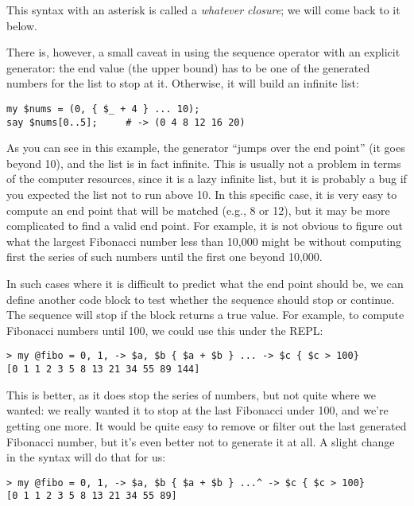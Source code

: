 This syntax with an asterisk is called a 
\emph{whatever closure}; we will come back to 
it below.

There is, however, a small caveat in using the sequence operator with 
an explicit generator: the end value (the upper bound) has 
to be one of the generated numbers for the list to stop at 
it. Otherwise, it will build an infinite list:

\begin{verbatim}
my $nums = (0, { $_ + 4 } ... 10);
say $nums[0..5];     # -> (0 4 8 12 16 20)
\end{verbatim}

As you can see in this example, the generator ``jumps over the end 
point'' (it goes beyond 10), and the list is 
in fact infinite. This is usually not a problem 
in terms of the computer resources, since it is 
a lazy infinite list, but it is probably a bug if 
you expected the list not to run above 10. In this 
specific case, it is very easy to compute an end 
point that will be matched (e.g., 8 or 12), but it may be 
more complicated to find a valid end point. For example, 
it is not obvious to figure out what the largest 
Fibonacci number less than 10,000 might be without 
computing first the series of such numbers until the 
first one beyond 10,000.

In such cases where it is difficult to predict what the end 
point should be, we can define another code block to test 
whether the sequence should stop or continue. The sequence 
will stop if the block returns a true value. For example, 
to compute Fibonacci numbers until 100, we could use this 
under the REPL:

\begin{verbatim}
> my @fibo = 0, 1, -> $a, $b { $a + $b } ... -> $c { $c > 100}
[0 1 1 2 3 5 8 13 21 34 55 89 144]
\end{verbatim}

This is better, as it does stop the series of numbers, but 
not quite where we wanted: we really wanted it to stop at the last 
Fibonacci under 100, and we're getting one more. It would be 
quite easy to remove or filter out the last generated Fibonacci 
number, but it's even better not to generate it at all. A slight 
change in the syntax will do that for us:

\begin{verbatim}
> my @fibo = 0, 1, -> $a, $b { $a + $b } ...^ -> $c { $c > 100}
[0 1 1 2 3 5 8 13 21 34 55 89]
\end{verbatim}

